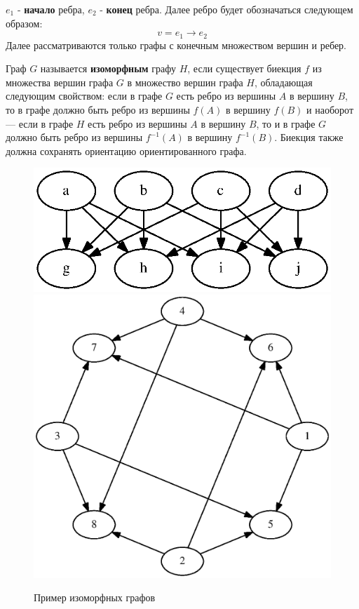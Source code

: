 \documentclass[russian,utf8,emptystyle]{eskdtext}
\begin{document}
\begin{spacing}{1.5}
$e_1$ - \textbf{начало} ребра, $e_2$ - \textbf{конец} ребра. Далее ребро будет обозначаться следующем образом:
$$
v = e_1 \rightarrow e_2
$$
Далее рассматриваются только графы с конечным множеством вершин и ребер.

Граф $G$ называется \textbf{изоморфным} графу $H$, если существует биекция $f$ из множества вершин графа $G$ в множество вершин графа $H$, обладающая следующим свойством: если в графе $G$ есть ребро из вершины $A$ в вершину $B$, то в графе должно быть ребро из вершины $f(A)$ в вершину $f(B)$ и наоборот --- если в графе $H$ есть ребро из вершины $A$ в вершину $B$, то и в графе $G$ должно быть ребро из вершины $f^{-1}(A)$ в вершину $f^{-1}(B)$. Биекция также должна сохранять ориентацию ориентированного графа.

\begin{figure}[h!]
\centering
\includegraphics[scale=0.6]{graphs_isomorph_example_1}
\includegraphics[scale=0.6]{graphs_isomorph_example_2}
\caption{Пример изоморфных графов}
\label{fig:graphs_isomorph_example}
\end{figure}


\end{spacing}
\end{document}
